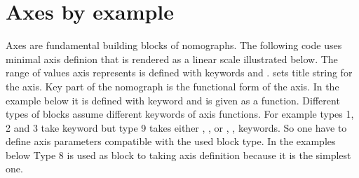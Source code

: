 \documentclass[a4paper,11pt,english]{sphinxmanual}
\begin{document}
\section{Axes by example}
\label{axes/axes:axes-by-example}
Axes are fundamental building blocks of nomographs. The following code uses minimal axis definion  that is
rendered as a linear scale illustrated below. The range of values axis represents is defined with keywords 
and .  sets title string for the axis. Key part of the nomograph is the functional form of the axis.
In the example below it is defined with keyword  and is given as a function. Different types of blocks assume different keywords
of axis functions. For example types 1, 2 and 3 take keyword  but type 9 takes either , ,  or
, ,  keywords. So one have to define axis parameters compatible with the used block type.
In the examples below Type 8 is used as block to taking axis definition because it is the simplest one.
\label{axes/axes:axes-ex-code-ref}
\end{document}
